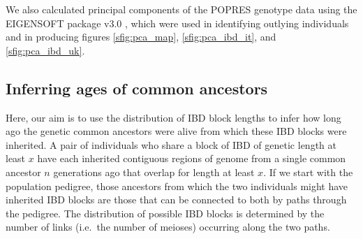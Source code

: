 \documentclass{article}
\begin{document}
We also calculated principal components of the POPRES genotype data
using the EIGENSOFT package v3.0 \citep{patterson2006population},
which were used in identifying outlying individuals
and in producing figures \ref{sfig:pca_map}, \ref{sfig:pca_ibd_it}, and \ref{sfig:pca_ibd_uk}. 


\subsection{Inferring ages of common ancestors}
\label{ss:inversion_methods}

Here, our aim is to use the distribution of IBD block lengths
to infer how long ago the genetic common ancestors were alive from which these IBD blocks were inherited.
A pair of individuals who share a block of IBD of genetic length at least $x$
have each inherited contiguous regions of genome from a single common ancestor $n$ generations ago
that overlap for length at least $x$.
If we start with the population pedigree,
those ancestors from which the two individuals might have inherited IBD blocks
are those that can be connected to both by paths through the pedigree.
The distribution of possible IBD blocks is determined by the number of links
(i.e.\ the number of meioses) occurring along the two paths.
\end{document}

